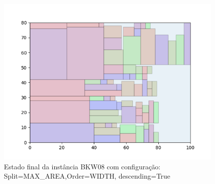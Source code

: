 \begin{figure}[H]
    \centering
    \caption[]{Estado final da instância BKW08 com configuração: Split=MAX_AREA,Order=WIDTH, descending=True}
    \label{fig:bkw08-max_area-width-true}
    \includegraphics[scale=0.5]{output/figures/bkw/bkw08/max_area/width/true/00}
\end{figure}
